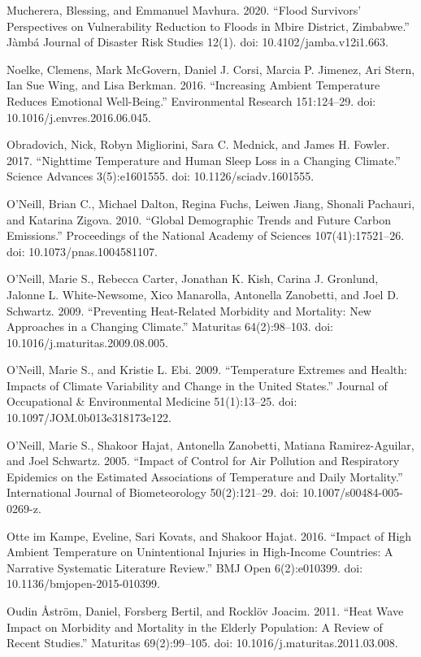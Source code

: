 \documentclass[12pt]{article}
\begin{document}
Mucherera, Blessing, and Emmanuel Mavhura. 2020. ``Flood Survivors'
Perspectives on Vulnerability Reduction to Floods in Mbire District,
Zimbabwe.'' Jàmbá Journal of Disaster Risk Studies 12(1). doi:
10.4102/jamba.v12i1.663.

Noelke, Clemens, Mark McGovern, Daniel J. Corsi, Marcia P. Jimenez, Ari
Stern, Ian Sue Wing, and Lisa Berkman. 2016. ``Increasing Ambient
Temperature Reduces Emotional Well-Being.'' Environmental Research
151:124--29. doi: 10.1016/j.envres.2016.06.045.

Obradovich, Nick, Robyn Migliorini, Sara C. Mednick, and James H.
Fowler. 2017. ``Nighttime Temperature and Human Sleep Loss in a Changing
Climate.'' Science Advances 3(5):e1601555. doi: 10.1126/sciadv.1601555.

O'Neill, Brian C., Michael Dalton, Regina Fuchs, Leiwen Jiang, Shonali
Pachauri, and Katarina Zigova. 2010. ``Global Demographic Trends and
Future Carbon Emissions.'' Proceedings of the National Academy of
Sciences 107(41):17521--26. doi: 10.1073/pnas.1004581107.

O'Neill, Marie S., Rebecca Carter, Jonathan K. Kish, Carina J. Gronlund,
Jalonne L. White-Newsome, Xico Manarolla, Antonella Zanobetti, and Joel
D. Schwartz. 2009. ``Preventing Heat-Related Morbidity and Mortality:
New Approaches in a Changing Climate.'' Maturitas 64(2):98--103. doi:
10.1016/j.maturitas.2009.08.005.

O'Neill, Marie S., and Kristie L. Ebi. 2009. ``Temperature Extremes and
Health: Impacts of Climate Variability and Change in the United
States.'' Journal of Occupational \& Environmental Medicine
51(1):13--25. doi: 10.1097/JOM.0b013e318173e122.

O'Neill, Marie S., Shakoor Hajat, Antonella Zanobetti, Matiana
Ramirez-Aguilar, and Joel Schwartz. 2005. ``Impact of Control for Air
Pollution and Respiratory Epidemics on the Estimated Associations of
Temperature and Daily Mortality.'' International Journal of
Biometeorology 50(2):121--29. doi: 10.1007/s00484-005-0269-z.

Otte im Kampe, Eveline, Sari Kovats, and Shakoor Hajat. 2016. ``Impact
of High Ambient Temperature on Unintentional Injuries in High-Income
Countries: A Narrative Systematic Literature Review.'' BMJ Open
6(2):e010399. doi: 10.1136/bmjopen-2015-010399.

Oudin Åström, Daniel, Forsberg Bertil, and Rocklöv Joacim. 2011. ``Heat
Wave Impact on Morbidity and Mortality in the Elderly Population: A
Review of Recent Studies.'' Maturitas 69(2):99--105. doi:
10.1016/j.maturitas.2011.03.008.
\end{document}
